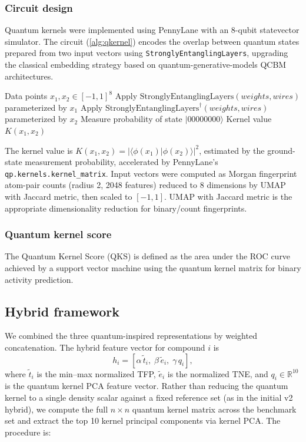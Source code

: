 \documentclass[11pt,a4paper]{article}
\begin{document}
\subsubsection{Circuit design}

Quantum kernels were implemented using PennyLane \citep{pennylane_2024} with an 8-qubit statevector simulator. The circuit (\cref{alg:qkernel}) encodes the overlap between quantum states prepared from two input vectors using \texttt{StronglyEntanglingLayers}, upgrading the classical embedding strategy based on quantum-generative-models QCBM architectures.

\begin{algorithm}[htbp]
\caption{Quantum kernel circuit for 8-qubit state overlap using StronglyEntanglingLayers.}
\label{alg:qkernel}
\begin{algorithmic}[1]
\REQUIRE Data points $x_1, x_2 \in [-1, 1]^8$
\STATE Apply $\mathrm{StronglyEntanglingLayers}(weights, wires)$ parameterized by $x_1$
\STATE Apply $\mathrm{StronglyEntanglingLayers}^\dagger(weights, wires)$ parameterized by $x_2$
\STATE Measure probability of state $|00000000\rangle$
\RETURN Kernel value $K(x_1, x_2)$
\end{algorithmic}
\end{algorithm}

The kernel value is $K(x_1, x_2) = |\langle \phi(x_1) | \phi(x_2) \rangle|^2$, estimated by the ground-state measurement probability, accelerated by PennyLane's \texttt{qp.kernels.kernel\_matrix}. Input vectors were computed as Morgan fingerprint atom-pair counts (radius 2, \num{2048} features) reduced to 8 dimensions by UMAP with Jaccard metric, then scaled to $[-1, 1]$. UMAP with Jaccard metric is the appropriate dimensionality reduction for binary/count fingerprints.

\subsubsection{Quantum kernel score}

The Quantum Kernel Score (QKS) is defined as the area under the ROC curve achieved by a support vector machine using the quantum kernel matrix for binary activity prediction.

\subsection{Hybrid framework}

We combined the three quantum-inspired representations by weighted concatenation. The hybrid feature vector for compound $i$ is
\begin{equation}
h_i = \left[\alpha\,\tilde{t}_i,\; \beta\,\tilde{e}_i,\; \gamma\,q_i\right],
\end{equation}
where $\tilde{t}_i$ is the min--max normalized TFP, $\tilde{e}_i$ is the normalized TNE, and $q_i \in \mathbb{R}^{10}$ is the quantum kernel PCA feature vector. Rather than reducing the quantum kernel to a single density scalar against a fixed reference set (as in the initial v2 hybrid), we compute the full $n \times n$ quantum kernel matrix across the benchmark set and extract the top \num{10} kernel principal components via kernel PCA. The procedure is:
\end{document}

